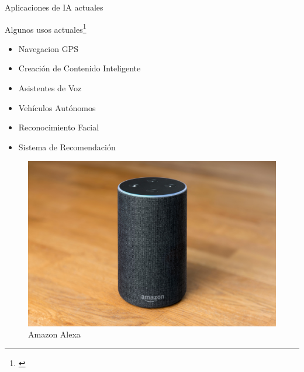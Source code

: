 \documentclass[aspectratio=169, 9pt]{beamer}
\begin{document}
\begin{frame}[label={sec:org2cc85b8}]{Aplicaciones de IA actuales}
\begin{block}{Algunos usos actuales\footnote{\autocite{Biswal_2023}}}
\begin{twoc}
\begin{itemize}
\item Navegacion GPS
\item Creación de Contenido Inteligente
\item Asistentes de Voz
\item Vehículos Autónomos
\item Reconocimiento Facial
\item Sistema de Recomendación
\end{itemize}
\end{twoc}
\begin{threec}
\begin{figure}[htbp]
\centering
\includegraphics[width=.9\linewidth]{images/alexa.png}
\caption{Amazon Alexa}
\end{figure}
\end{threec}
\end{block}
\end{frame}
\end{document}
